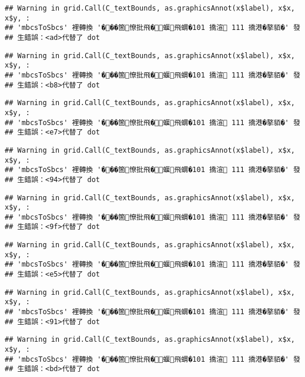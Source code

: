 \documentclass[
]{article}
\begin{document}
\begin{verbatim}
## Warning in grid.Call(C_textBounds, as.graphicsAnnot(x$label), x$x, x$y, :
## 'mbcsToSbcs' 裡轉換 '���箇憭批飛�蝘飛蝟�101 撟渲 111 撟港�摮貊�' 發
## 生錯誤：<ad>代替了 dot
\end{verbatim}

\begin{verbatim}
## Warning in grid.Call(C_textBounds, as.graphicsAnnot(x$label), x$x, x$y, :
## 'mbcsToSbcs' 裡轉換 '���箇憭批飛�蝘飛蝟�101 撟渲 111 撟港�摮貊�' 發
## 生錯誤：<b8>代替了 dot
\end{verbatim}

\begin{verbatim}
## Warning in grid.Call(C_textBounds, as.graphicsAnnot(x$label), x$x, x$y, :
## 'mbcsToSbcs' 裡轉換 '���箇憭批飛�蝘飛蝟�101 撟渲 111 撟港�摮貊�' 發
## 生錯誤：<e7>代替了 dot
\end{verbatim}

\begin{verbatim}
## Warning in grid.Call(C_textBounds, as.graphicsAnnot(x$label), x$x, x$y, :
## 'mbcsToSbcs' 裡轉換 '���箇憭批飛�蝘飛蝟�101 撟渲 111 撟港�摮貊�' 發
## 生錯誤：<94>代替了 dot
\end{verbatim}

\begin{verbatim}
## Warning in grid.Call(C_textBounds, as.graphicsAnnot(x$label), x$x, x$y, :
## 'mbcsToSbcs' 裡轉換 '���箇憭批飛�蝘飛蝟�101 撟渲 111 撟港�摮貊�' 發
## 生錯誤：<9f>代替了 dot
\end{verbatim}

\begin{verbatim}
## Warning in grid.Call(C_textBounds, as.graphicsAnnot(x$label), x$x, x$y, :
## 'mbcsToSbcs' 裡轉換 '���箇憭批飛�蝘飛蝟�101 撟渲 111 撟港�摮貊�' 發
## 生錯誤：<e5>代替了 dot
\end{verbatim}

\begin{verbatim}
## Warning in grid.Call(C_textBounds, as.graphicsAnnot(x$label), x$x, x$y, :
## 'mbcsToSbcs' 裡轉換 '���箇憭批飛�蝘飛蝟�101 撟渲 111 撟港�摮貊�' 發
## 生錯誤：<91>代替了 dot
\end{verbatim}

\begin{verbatim}
## Warning in grid.Call(C_textBounds, as.graphicsAnnot(x$label), x$x, x$y, :
## 'mbcsToSbcs' 裡轉換 '���箇憭批飛�蝘飛蝟�101 撟渲 111 撟港�摮貊�' 發
## 生錯誤：<bd>代替了 dot
\end{verbatim}
\end{document}
